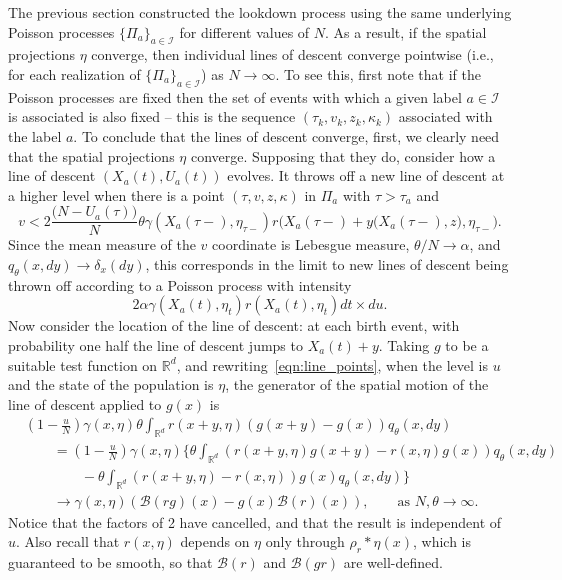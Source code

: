 \documentclass[EJP]{ejpecp} %
\newcommand{\IR}{\mathbb R}
\newcommand{\DG}{\mathcal{B}}  %
\newcommand{\kernel}{\rho}  %
\newcommand{\smooth}[1]{\kernel_{#1} \! * \!}  %
\newcommand{\labelspace}{\mathcal{I}} %
\begin{document}
The previous section constructed the lookdown process
using the same underlying Poisson processes $\{\Pi_a\}_{a \in \labelspace}$ for
different values of $N$.
As a result, if the spatial projections $\eta$ converge, then
individual lines of descent converge pointwise (i.e., for each realization of $\{\Pi_a\}_{a \in \labelspace}$)
as $N \to \infty$. 
To see this, first note that if the Poisson processes are fixed
then the set of events with which a given label $a \in \labelspace$ is associated
is also fixed -- this is the sequence $(\tau_k, v_k, z_k, \kappa_k)$ associated 
with the label $a$.
To conclude that the lines of descent converge, 
first, we clearly need that the spatial projections $\eta$ converge.
%
Supposing that they do,
consider how a line of descent $(X_a(t), U_a(t))$ evolves.
It throws off a new line of descent at a higher level
when there is a point $(\tau, v, z, \kappa)$ in $\Pi_a$ with $\tau > \tau_a$ and
\begin{equation} \label{eqn:line_points}
    v < 2 \frac{\big(N - U_a(\tau)\big)}{N} \theta \gamma(X_a(\tau-), \eta_{\tau-}) 
	r\Big(X_a(\tau-) + y\big(X_a(\tau-),z\big), \eta_{\tau-}\Big) .
\end{equation}
Since the mean measure of the $v$ coordinate is Lebesgue measure,
$\theta/N \to \alpha$,
and $q_\theta(x, dy) \to \delta_x(dy)$,
this corresponds in the limit to new lines of descent being thrown off 
according to a Poisson process with intensity
$$
2 \alpha \gamma(X_a(t), \eta_t) r(X_a(t), \eta_t)dt \times du.
$$
Now consider the location of the line of descent:
at each birth event, with probability one half
the line of descent jumps to $X_a(t) + y$.
Taking $g$ to be a suitable test function on $\IR^d$, 
and rewriting~\eqref{eqn:line_points}, when the level is $u$
and the state of the population is $\eta$, the generator of the
spatial motion of the line of descent
applied to $g(x)$ is
\begin{align*}
    &
    \left(1 - \frac{u}{N}\right) \gamma(x, \eta)
    \theta \int_{\IR^d} r(x+y, \eta) (g(x+y) - g(x)) q_\theta(x, dy) \\
    &\qquad {}
    =
    \left(1 - \frac{u}{N}\right) \gamma(x, \eta)
    \bigg\{
        \theta \int_{\IR^d} (r(x+y, \eta) g(x+y) - r(x, \eta) g(x)) q_\theta(x, dy) \\
        &\qquad \qquad {}
        -
        \theta \int_{\IR^d} (r(x+y, \eta) - r(x, \eta) ) g(x) q_\theta(x, dy) 
    \bigg\} \\
    &\qquad {}
    \to
    \gamma(x, \eta)
    \left(
        \DG(rg)(x) - g(x) \DG(r)(x)
    \right) ,
    \qquad \text{as } N, \theta \to \infty .
\end{align*}
Notice that the factors of 2 have cancelled,
and that the result is independent of $u$.
Also recall that $r(x, \eta)$ depends on $\eta$ only
through $\smooth{r}\eta(x)$,
which is guaranteed to be smooth, so that $\DG(r)$ 
and $\DG(gr)$ are well-defined.
\end{document}
